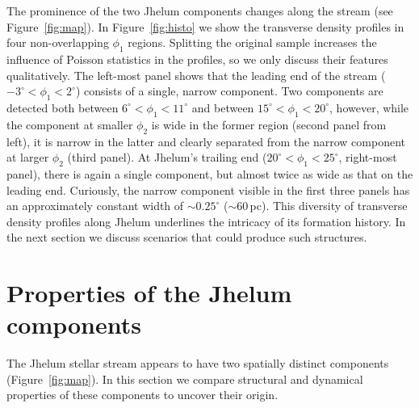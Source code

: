 \documentclass[twocolumn]{aastex62}
\begin{document}
The prominence of the two Jhelum components changes along the stream (see Figure~\ref{fig:map}).
In Figure~\ref{fig:histo} we show the transverse density profiles in four non-overlapping $\phi_1$ regions.
Splitting the original sample increases the influence of Poisson statistics in the profiles, so we only discuss their features qualitatively.
The left-most panel shows that the leading end of the stream ($-3^\circ<\phi_1<2^\circ$) consists of a single, narrow component.
Two components are detected both between $6^\circ<\phi_1<11^\circ$ and between $15^\circ<\phi_1<20^\circ$, however, while the component at smaller $\phi_2$ is wide in the former region (second panel from left), it is narrow in the latter and clearly separated from the narrow component at larger $\phi_2$ (third panel).
At Jhelum's trailing end ($20^\circ<\phi_1<25^\circ$, right-most panel), there is again a single component, but almost twice as wide as that on the leading end.
Curiously, the narrow component visible in the first three panels has an approximately constant width of $\sim0.25^\circ$ ($\sim60\,$pc).
This diversity of transverse density profiles along Jhelum underlines the intricacy of its formation history.
In the next section we discuss scenarios that could produce such structures.

\section{Properties of the Jhelum components}
\label{sec:origin}
The Jhelum stellar stream appears to have two spatially distinct components (Figure~\ref{fig:map}).
In this section we compare structural and dynamical properties of these components to uncover their origin.

\end{document}
